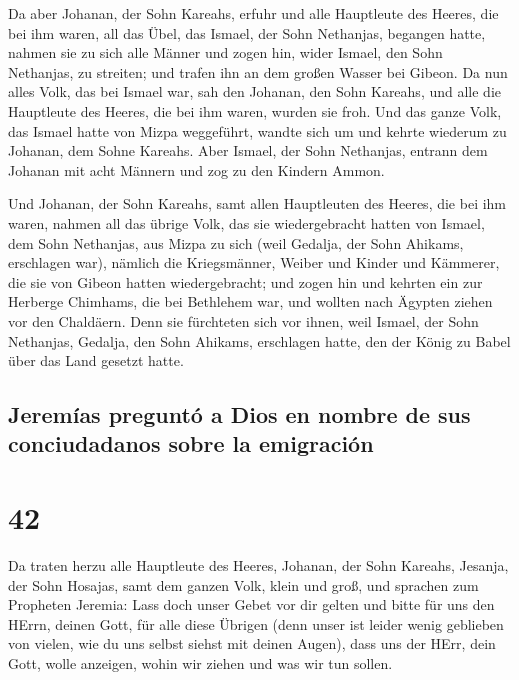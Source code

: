  Da aber Johanan, der Sohn Kareahs, erfuhr und alle
Hauptleute des Heeres, die bei ihm waren, all das Übel, das Ismael, der
Sohn Nethanjas, begangen hatte,  nahmen sie zu sich alle
Männer und zogen hin, wider Ismael, den Sohn Nethanjas, zu streiten; und
trafen ihn an dem großen Wasser bei Gibeon.  Da nun alles
Volk, das bei Ismael war, sah den Johanan, den Sohn Kareahs, und alle
die Hauptleute des Heeres, die bei ihm waren, wurden sie froh.
 Und das ganze Volk, das Ismael hatte von Mizpa
weggeführt, wandte sich um und kehrte wiederum zu Johanan, dem Sohne
Kareahs.  Aber Ismael, der Sohn Nethanjas, entrann dem
Johanan mit acht Männern und zog zu den Kindern Ammon.

 Und Johanan, der Sohn Kareahs, samt allen Hauptleuten
des Heeres, die bei ihm waren, nahmen all das übrige Volk, das sie
wiedergebracht hatten von Ismael, dem Sohn Nethanjas, aus Mizpa zu sich
(weil Gedalja, der Sohn Ahikams, erschlagen war), nämlich die
Kriegsmänner, Weiber und Kinder und Kämmerer, die sie von Gibeon hatten
wiedergebracht;  und zogen hin und kehrten ein zur
Herberge Chimhams, die bei Bethlehem war, und wollten nach Ägypten
ziehen vor den Chaldäern.  Denn sie fürchteten sich vor
ihnen, weil Ismael, der Sohn Nethanjas, Gedalja, den Sohn Ahikams,
erschlagen hatte, den der König zu Babel über das Land gesetzt hatte.

\hypertarget{jeremuxedas-preguntuxf3-a-dios-en-nombre-de-sus-conciudadanos-sobre-la-emigraciuxf3n}{%
\subsection{Jeremías preguntó a Dios en nombre de sus conciudadanos
sobre la
emigración}\label{jeremuxedas-preguntuxf3-a-dios-en-nombre-de-sus-conciudadanos-sobre-la-emigraciuxf3n}}

\hypertarget{section-41}{%
\section{42}\label{section-41}}

 Da traten herzu alle Hauptleute des Heeres, Johanan, der
Sohn Kareahs, Jesanja, der Sohn Hosajas, samt dem ganzen Volk, klein und
groß,  und sprachen zum Propheten Jeremia: Lass doch unser
Gebet vor dir gelten und bitte für uns den HErrn, deinen Gott, für alle
diese Übrigen (denn unser ist leider wenig geblieben von vielen, wie du
uns selbst siehst mit deinen Augen),  dass uns der HErr,
dein Gott, wolle anzeigen, wohin wir ziehen und was wir tun sollen.

